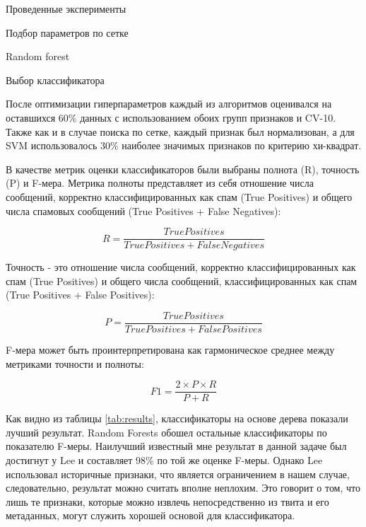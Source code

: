 \begin{section}{Проведенные эксперименты}
\begin{subsection}{Подбор параметров по сетке}
\begin{subsubsection}{Random forest}
\end{subsubsection}

\end{subsection}

\begin{subsection}{Выбор классификатора}

  После оптимизации гиперпараметров каждый из алгоритмов оценивался на оставшихся 60\% данных с использованием обоих групп признаков и CV-10. Также как и в случае поиска по сетке, каждый признак был нормализован, а для SVM использовалось 30\% наиболее значимых признаков по критерию хи-квадрат.


В качестве метрик оценки классификаторов были выбраны полнота (R), точность (P) и F-мера. Метрика полноты представляет из себя отношение числа сообщений, корректно классифицированных как спам (True Positives) и общего числа спамовых сообщений (True Positives + False Negatives):

\begin{equation}
  R = \frac{True Positives}{True Positives + False Negatives}
\end{equation}

Точность - это отношение числа сообщений, корректно классифицированных как спам (True Positives) и общего числа  сообщений, классифицированных как спам (True Positives + False Positives):

\begin{equation}
  P = \frac{True Positives}{True Positives + False Positives}
\end{equation}

F-мера может быть проинтерпретирована как гармоническое среднее между метриками точности и полноты:

\begin{equation}
  F1 = \frac{2 \times P \times R}{P + R}
\end{equation}

Как видно из таблицы \ref{tab:results}, классификаторы на основе дерева показали лучший результат. Random Forests обошел остальные классификаторы по показателю F-меры. Наилучший известный мне результат в данной задаче был достигнут у Lee \cite{Lee} и составляет 98\% по той же оценке F-меры. Однако Lee использовал историчные признаки, что является ограничением в нашем случае, следовательно, результат можно считать вполне неплохим. Это говорит о том, что лишь те признаки, которые можно извлечь непосредственно из твита и его метаданных,  могут служить хорошей основой для классификатора.



\end{subsection}
\end{section}
